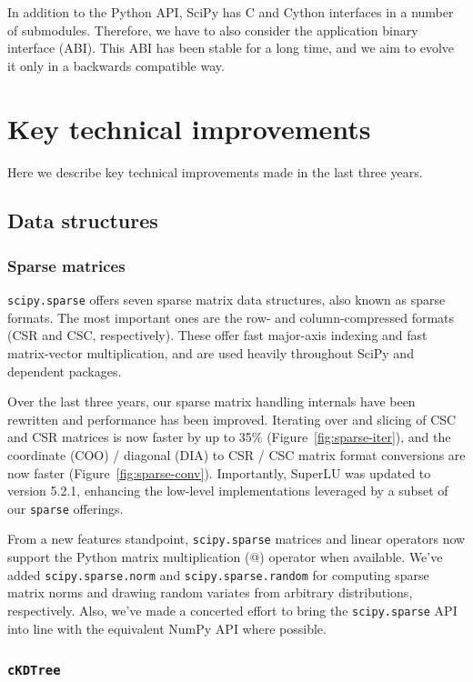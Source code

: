 \documentclass[fleqn,10pt]{wlscirep}
\begin{document}
In addition to the Python API, SciPy has C and Cython interfaces in a number
of submodules. Therefore, we have to also consider the application binary
interface (ABI). This ABI has been stable for a long time, and we aim to
evolve it only in a backwards compatible way.

\section*{Key technical improvements}
\label{sec:technical_improvements}
Here we describe key technical improvements made in the last three years.

\subsection*{Data structures}

\subsubsection*{Sparse matrices}

\texttt{scipy.sparse} offers seven sparse matrix data structures,
also known as sparse formats. The most important ones are the row- 
and column-compressed formats (CSR and CSC, respectively). 
These offer fast major-axis indexing and fast matrix-vector multiplication,
and are used heavily throughout SciPy and dependent packages.

Over the last three years, our sparse matrix handling internals have been
rewritten and performance has been improved. Iterating over and slicing of CSC
and CSR matrices is now faster by up to 35\% (Figure~\ref{fig:sparse-iter}),
 and the coordinate (COO) / diagonal (DIA) to CSR / CSC matrix format
conversions are now faster (Figure~\ref{fig:sparse-conv}). Importantly,
SuperLU\cite{superlu_ug99} was updated to version 5.2.1, enhancing the
low-level implementations leveraged by a subset of our \texttt{sparse}
offerings.

From a new features standpoint, \texttt{scipy.sparse} matrices and linear
operators now support the Python matrix multiplication (@) operator when
available. We've added \texttt{scipy.sparse.norm} and
\texttt{scipy.sparse.random} for computing sparse matrix norms and drawing
random variates from arbitrary distributions, respectively. Also, we've made a
concerted effort to bring the \texttt{scipy.sparse} API into line with the
equivalent NumPy API where possible.

\subsubsection*{\texttt{cKDTree}}
\end{document}
